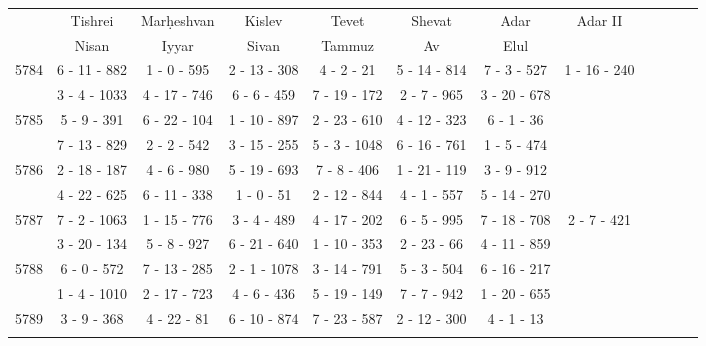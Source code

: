 \begin{longtable}{c | c | c | c | c | c | c | c | c | c | c | c}
	\space&Tishrei&Mar\d{h}eshvan&Kislev&Tevet&Shevat&Adar&Adar II\\
	\space&Nisan&Iyyar&Sivan&Tammuz&Av&Elul&\\\hline\endhead
\multirow{2}{*}{5784}
& 6 - 11 - 882
&
1 - 0 - 595
&
2 - 13 - 308
&
4 - 2 - 21
&
5 - 14 - 814
&
7 - 3 - 527
&
1 - 16 - 240
\\* \space
&
3 - 4 - 1033
&
4 - 17 - 746
&
6 - 6 - 459
&
7 - 19 - 172
&
2 - 7 - 965
&
3 - 20 - 678
&\space\\\hline
\multirow{2}{*}{5785}
& 5 - 9 - 391
&
6 - 22 - 104
&
1 - 10 - 897
&
2 - 23 - 610
&
4 - 12 - 323
&
6 - 1 - 36
&\space\\* \space
&
7 - 13 - 829
&
2 - 2 - 542
&
3 - 15 - 255
&
5 - 3 - 1048
&
6 - 16 - 761
&
1 - 5 - 474
&\space\\\hline
\multirow{2}{*}{5786}
& 2 - 18 - 187
&
4 - 6 - 980
&
5 - 19 - 693
&
7 - 8 - 406
&
1 - 21 - 119
&
3 - 9 - 912
&\space\\* \space
&
4 - 22 - 625
&
6 - 11 - 338
&
1 - 0 - 51
&
2 - 12 - 844
&
4 - 1 - 557
&
5 - 14 - 270
&\space\\\hline
\multirow{2}{*}{5787}
& 7 - 2 - 1063
&
1 - 15 - 776
&
3 - 4 - 489
&
4 - 17 - 202
&
6 - 5 - 995
&
7 - 18 - 708
&
2 - 7 - 421
\\* \space
&
3 - 20 - 134
&
5 - 8 - 927
&
6 - 21 - 640
&
1 - 10 - 353
&
2 - 23 - 66
&
4 - 11 - 859
&\space\\\hline
\multirow{2}{*}{5788}
& 6 - 0 - 572
&
7 - 13 - 285
&
2 - 1 - 1078
&
3 - 14 - 791
&
5 - 3 - 504
&
6 - 16 - 217
&\space\\* \space
&
1 - 4 - 1010
&
2 - 17 - 723
&
4 - 6 - 436
&
5 - 19 - 149
&
7 - 7 - 942
&
1 - 20 - 655
&\space\\\hline
\multirow{2}{*}{5789}
& 3 - 9 - 368
&
4 - 22 - 81
&
6 - 10 - 874
&
7 - 23 - 587
&
2 - 12 - 300
&
4 - 1 - 13
&\space\\* \space
&

\end{longtable}
